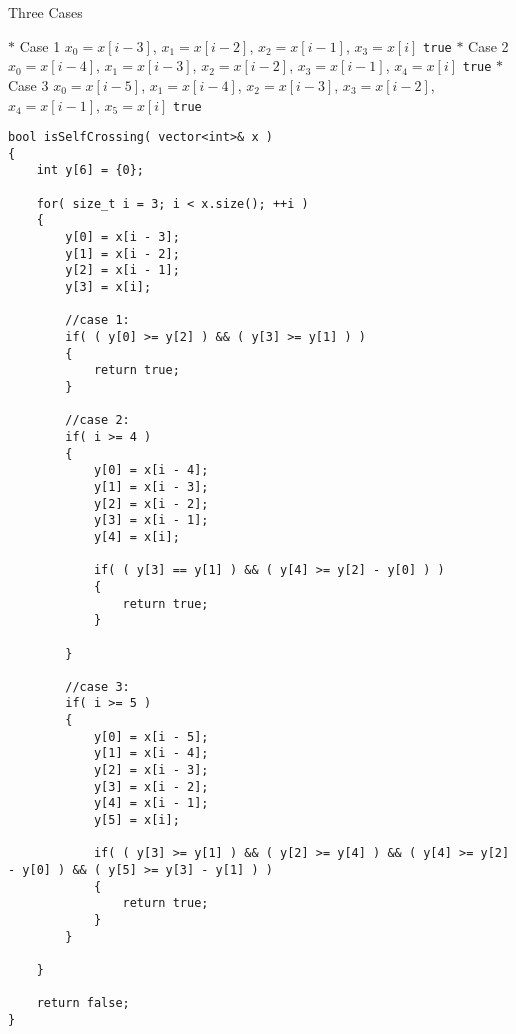 \setcounter{algorithm}{0}
\begin{algorithm}[H]
\caption{Three Cases}
\begin{algorithmic}[1]
\State $\ast$ Case 1
\State $x_0 = x[i-3]$, $ x_1= x[i-2] $, $ x_2 = x[i-1] $, $ x_3 = x[i] $
\State \Return \texttt{true}
\EndIf
{}
\State $\ast$ Case 2
\State $x_0 = x[i-4]$, $ x_1= x[i-3] $, $ x_2 = x[i-2] $, $ x_3 = x[i-1] $, $ x_4 = x[i] $
\State \Return \texttt{true}
\EndIf
\EndIf
{}
\State $\ast$ Case 3
\State $x_0 = x[i-5]$, $ x_1= x[i-4] $, $ x_2 = x[i-3] $, $ x_3 = x[i-2] $, $ x_4 = x[i-1] $, $ x_5 = x[i] $
\State \Return \texttt{true}
\EndIf
{}
\end{algorithmic}
\end{algorithm}
\begin{algorithm}[H]
\begin{algorithmic}[1]
\EndIf
\EndFor
\EndProcedure
\end{algorithmic}
\end{algorithm}
\setcounter{lstlisting}{0}
\begin{lstlisting}[style=customc, caption={Three Cases}]
bool isSelfCrossing( vector<int>& x )
{
    int y[6] = {0};

    for( size_t i = 3; i < x.size(); ++i )
    {
        y[0] = x[i - 3];
        y[1] = x[i - 2];
        y[2] = x[i - 1];
        y[3] = x[i];

        //case 1:
        if( ( y[0] >= y[2] ) && ( y[3] >= y[1] ) )
        {
            return true;
        }

        //case 2:
        if( i >= 4 )
        {
            y[0] = x[i - 4];
            y[1] = x[i - 3];
            y[2] = x[i - 2];
            y[3] = x[i - 1];
            y[4] = x[i];

            if( ( y[3] == y[1] ) && ( y[4] >= y[2] - y[0] ) )
            {
                return true;
            }

        }

        //case 3:
        if( i >= 5 )
        {
            y[0] = x[i - 5];
            y[1] = x[i - 4];
            y[2] = x[i - 3];
            y[3] = x[i - 2];
            y[4] = x[i - 1];
            y[5] = x[i];

            if( ( y[3] >= y[1] ) && ( y[2] >= y[4] ) && ( y[4] >= y[2] - y[0] ) && ( y[5] >= y[3] - y[1] ) )
            {
                return true;
            }
        }

    }

    return false;
}

\end{lstlisting}